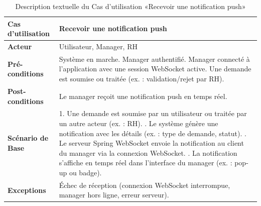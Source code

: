     \newpage
    \begin{table}[!ht]
        \centering
        \caption{Description textuelle du Cas d’utilisation «Recevoir une notification push»}
        \label{tab:receive_push_notification_websocket}
        \renewcommand{\arraystretch}{1.2}
        \begin{tabular}{|p{4.2cm}|p{11cm}|}
        \hline
        \textbf{Cas d'utilisation} & Recevoir une notification push \\
        \hline
        \textbf{Acteur} & Utilisateur, Manager, RH \\
        \hline
        \textbf{Pré-conditions} & Système en marche. \newline Manager authentifié. \newline Manager connecté à l’application avec une session WebSocket active. \newline Une demande est soumise ou traitée (ex. : validation/rejet par RH). \\
        \hline
        \textbf{Post-conditions} & Le manager reçoit une notification push en temps réel. \\
        \hline
        \textbf{Scénario de Base} & 
        1. Une demande est soumise par un utilisateur ou traitée par un autre acteur (ex. : RH). \newline
        2. Le système génère une notification avec les détails (ex. : type de demande, statut). \newline
        3. Le serveur Spring WebSocket envoie la notification au client du manager via la connexion WebSocket. \newline
        4. La notification s’affiche en temps réel dans l’interface du manager (ex. : pop-up ou badge). \\
        \hline
        \textbf{Exceptions} & 
        Échec de réception (connexion WebSocket interrompue, manager hors ligne, erreur serveur). \\
        \hline
        \end{tabular}
        \end{table}
